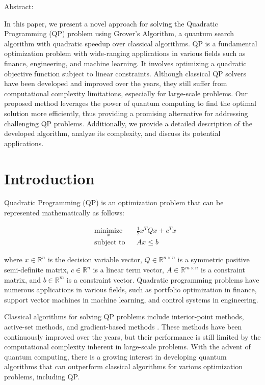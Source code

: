 Abstract:

In this paper, we present a novel approach for solving the Quadratic Programming (QP) problem using Grover's Algorithm, a quantum search algorithm with quadratic speedup over classical algorithms. QP is a fundamental optimization problem with wide-ranging applications in various fields such as finance, engineering, and machine learning. It involves optimizing a quadratic objective function subject to linear constraints. Although classical QP solvers have been developed and improved over the years, they still suffer from computational complexity limitations, especially for large-scale problems. Our proposed method leverages the power of quantum computing to find the optimal solution more efficiently, thus providing a promising alternative for addressing challenging QP problems. Additionally, we provide a detailed description of the developed algorithm, analyze its complexity, and discuss its potential applications.

\section{Introduction}

Quadratic Programming (QP) is an optimization problem that can be represented mathematically as follows:

\begin{equation}
\begin{aligned}
& \underset{x}{\text{minimize}}
& & \frac{1}{2}x^TQx + c^Tx \\
& \text{subject to}
& & Ax\leq b
\end{aligned}
\end{equation}

where $x \in \mathbb{R}^n$ is the decision variable vector, $Q \in \mathbb{R}^{n\times n}$ is a symmetric positive semi-definite matrix, $c \in \mathbb{R}^n$ is a linear term vector, $A \in \mathbb{R}^{m\times n}$ is a constraint matrix, and $b \in \mathbb{R}^m$ is a constraint vector. Quadratic programming problems have numerous applications in various fields, such as portfolio optimization in finance, support vector machines in machine learning, and control systems in engineering.

Classical algorithms for solving QP problems include interior-point methods, active-set methods, and gradient-based methods \cite{nocedal2006numerical}. These methods have been continuously improved over the years, but their performance is still limited by the computational complexity inherent in large-scale problems. With the advent of quantum computing, there is a growing interest in developing quantum algorithms that can outperform classical algorithms for various optimization problems, including QP.

